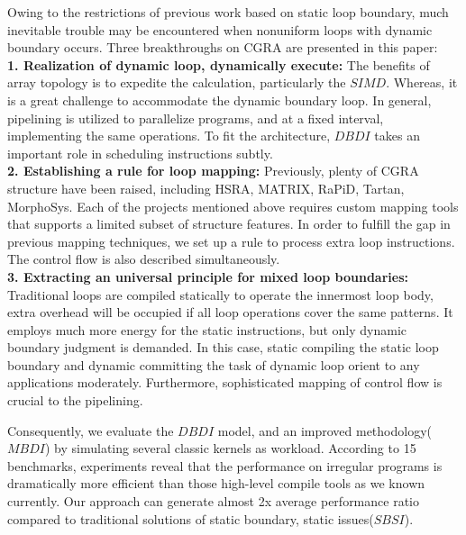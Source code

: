 \documentclass[10pt, conference, compsocconf]{IEEEtran}
\begin{document}
Owing to the restrictions of previous work based on static loop boundary, much inevitable trouble may be encountered when nonuniform loops with dynamic boundary occurs. Three breakthroughs on CGRA are presented in this paper:\\
\textbf{1. Realization of dynamic loop, dynamically execute:} The benefits of array topology is to expedite the calculation, particularly the $SIMD$. Whereas, it is a great challenge to accommodate the dynamic boundary loop.
In general, pipelining is utilized to parallelize programs, and at a fixed interval, implementing the same operations. To fit the architecture, $DBDI$ takes an important role in scheduling instructions subtly.\\
\textbf{2. Establishing a rule for loop mapping:} Previously, plenty of CGRA structure have been raised, including HSRA\cite{in-tsu1999hsra}, MATRIX\cite{in-mirsky1996matrix}, RaPiD\cite{in-hartenstein1996field}, Tartan\cite{in-mishra2007virtualization}, MorphoSys\cite{in-singh2000morphosys}. Each of the projects mentioned above requires custom mapping tools that supports a limited subset of structure features\cite{in-friedman2009spr}. In order to fulfill the gap in previous mapping techniques, we set up a rule to process extra loop instructions. The control flow is also described simultaneously. \\
\textbf{3. Extracting an universal principle for mixed loop boundaries:} Traditional loops are compiled statically to operate the innermost loop body, extra overhead will be occupied if all loop operations cover the same patterns. It employs much more energy for the static instructions, but only dynamic boundary judgment is demanded. In this case, static compiling the static loop boundary and dynamic committing the task of dynamic loop orient to any applications moderately. Furthermore, sophisticated mapping of control flow is crucial to the pipelining.

Consequently, we evaluate the $DBDI$ model, and an improved methodology($MBDI$) by simulating several classic kernels as workload. According to 15 benchmarks\cite{ev-asanovic2006landscape,ev-henning2006spec}, experiments reveal that the performance on irregular programs is dramatically more efficient than those high-level compile tools as we known currently. Our approach can generate almost 2x average performance ratio compared to traditional solutions of static boundary, static issues($SBSI$).

\end{document}
